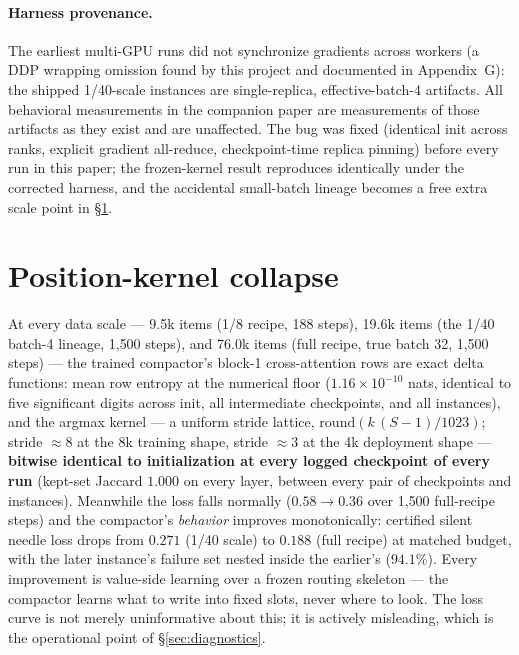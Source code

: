 \documentclass[11pt]{article}
\begin{document}
\paragraph{Harness provenance.} The earliest multi-GPU runs did not
synchronize gradients across workers (a DDP wrapping omission found by
this project and documented in Appendix~G): the shipped 1/40-scale
instances are single-replica, effective-batch-4 artifacts. All
behavioral measurements in the companion paper are measurements of those
artifacts as they exist and are unaffected. The bug was fixed (identical
init across ranks, explicit gradient all-reduce, checkpoint-time replica
pinning) before every run in this paper; the frozen-kernel result
reproduces identically under the corrected harness, and the accidental
small-batch lineage becomes a free extra scale point in
\S\ref{sec:collapse}.

\section{Position-kernel collapse}
\label{sec:collapse}

At every data scale --- 9.5k items (1/8 recipe, 188 steps), 19.6k items
(the 1/40 batch-4 lineage, 1{,}500 steps), and 76.0k items (full recipe,
true batch 32, 1{,}500 steps) --- the trained compactor's block-1
cross-attention rows are exact delta functions: mean row entropy at the
numerical floor ($1.16\times10^{-10}$ nats, identical to five significant
digits across init, all intermediate checkpoints, and all instances), and
the argmax kernel --- a uniform stride lattice,
$\mathrm{round}(k\,(S{-}1)/1023)$; stride ${\approx}8$ at the 8k training
shape, stride ${\approx}3$ at the 4k deployment shape --- \textbf{bitwise
identical to initialization at every logged checkpoint of every run}
(kept-set Jaccard $1.000$ on every layer, between every pair of
checkpoints and instances). Meanwhile the loss falls normally
($0.58 \to 0.36$ over 1{,}500 full-recipe steps) and the compactor's
\emph{behavior} improves monotonically: certified silent needle loss
drops from $0.271$ (1/40 scale) to $0.188$ (full recipe) at matched
budget, with the later instance's failure set nested inside the
earlier's ($94.1\%$). Every improvement is value-side learning over a
frozen routing skeleton --- the compactor learns what to write into
fixed slots, never where to look. The loss curve is not merely
uninformative about this; it is actively misleading, which is the
operational point of \S\ref{sec:diagnostics}.
\end{document}
